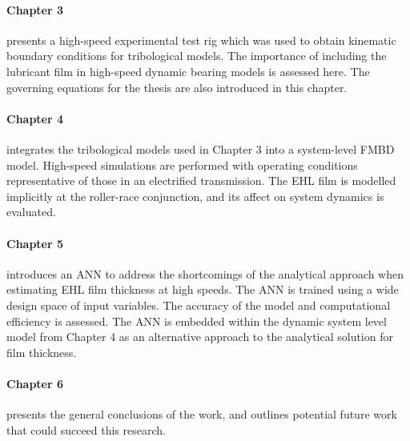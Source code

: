 \paragraph{Chapter 3} presents a high-speed experimental test rig which was used to obtain kinematic boundary conditions for tribological models. The importance of including the lubricant film in high-speed dynamic bearing models is assessed here. The governing equations for the thesis are also introduced in this chapter.

\paragraph{Chapter 4} integrates the tribological models used in Chapter 3 into a system-level FMBD model. High-speed simulations are performed with operating conditions representative of those in an electrified transmission. The EHL film is modelled implicitly at the roller-race conjunction, and its affect on system dynamics is evaluated.

\paragraph{Chapter 5} introduces an ANN  to address the shortcomings of the analytical approach when estimating EHL film thickness at high speeds. The ANN is trained using a wide design space of input variables. The accuracy of the model and computational efficiency is assessed. The ANN is embedded within the dynamic system level model from Chapter 4 as an alternative approach to the analytical solution for film thickness. 

\paragraph{Chapter 6} presents the general conclusions of the work, and outlines potential future work that could succeed this research.